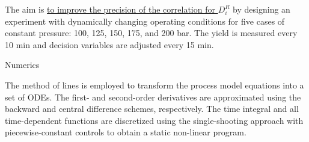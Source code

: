 \documentclass[a0,portrait]{a0poster}
\begin{document}
\begin{multicols}{2}
\begin{tcolorbox}[width=\linewidth, boxrule=0mm, sharp corners=all, colback=white]
The aim is \underline{to improve the precision of the correlation for $D_i^R$} by designing an experiment with dynamically changing operating conditions for five cases of constant pressure: 100, 125, 150, 175, and 200 bar. The yield is measured every 10 min and decision variables are adjusted every 15 min.
\end{tcolorbox}

\begin{tcolorbox}[width=\linewidth, boxrule=0mm, sharp corners=all, colback=white]
	{\LARGE Numerics\\}

The method of lines is employed to transform the process model equations into a set of ODEs. The first- and second-order derivatives are approximated using the backward and central difference schemes, respectively. The time integral and all time-dependent functions are discretized using the single-shooting approach with piecewise-constant controls to obtain a static non-linear program.
\end{tcolorbox}


\end{multicols}
\end{document}

